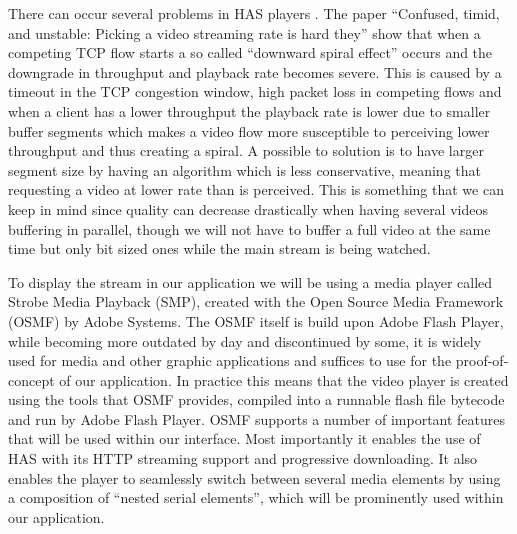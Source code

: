 \documentclass[9pt,a4paper]{acmproc}
\begin{document}
There can occur several problems in HAS players \cite[s.~317-326]{qualbranch}. The paper “Confused, timid, and unstable: Picking a video streaming rate is hard they” show that when a competing TCP flow starts a so called “downward spiral effect” occurs and the downgrade in throughput and playback rate becomes severe\cite{streamrate}. This is caused by a timeout in the TCP congestion window, high packet loss in competing flows and when a client has a lower throughput the playback rate is lower due to smaller buffer segments which makes a video flow more susceptible to perceiving lower throughput and thus creating a spiral. A possible to solution is to have larger segment size by having an algorithm which is less conservative, meaning that requesting a video at lower rate than is perceived. \cite{streamrate} This is something that we can keep in mind since quality can decrease drastically when having several videos buffering in parallel, though we will not have to buffer a full video at the same time but only bit sized ones while the main stream is being watched.

To display the stream in our application we will be using a media player called Strobe Media Playback (SMP), created with the Open Source Media Framework (OSMF) by Adobe Systems. The OSMF itself is build upon Adobe Flash Player, while becoming more outdated by day and discontinued by some, it is widely used for media and other graphic applications and suffices to use for the proof-of-concept of our application. In practice this means that the video player is created using the tools that OSMF provides, compiled into a runnable flash file bytecode and run by Adobe Flash Player. 
OSMF supports a number of important features that will be used within our interface. Most importantly it enables the use of HAS with its HTTP streaming support and progressive downloading. It also enables the player to seamlessly switch between several media elements by using a composition of “nested serial elements”, which will be prominently used within our application.\cite{osmf}
\end{document}
